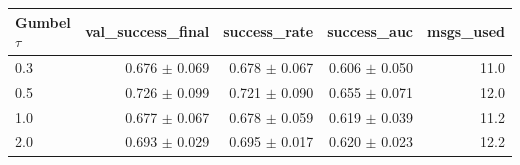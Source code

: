 \begin{tabular}{lrrrr}\toprule Gumbel $\tau$ & val\_success\_final & success\_rate & success\_auc & msgs\_used \\\midrule
0.3 & 0.676 $\pm$ 0.069 & 0.678 $\pm$ 0.067 & 0.606 $\pm$ 0.050 & 11.0 \\
0.5 & 0.726 $\pm$ 0.099 & 0.721 $\pm$ 0.090 & 0.655 $\pm$ 0.071 & 12.0 \\
1.0 & 0.677 $\pm$ 0.067 & 0.678 $\pm$ 0.059 & 0.619 $\pm$ 0.039 & 11.2 \\
2.0 & 0.693 $\pm$ 0.029 & 0.695 $\pm$ 0.017 & 0.620 $\pm$ 0.023 & 12.2 \\
\bottomrule\end{tabular}
